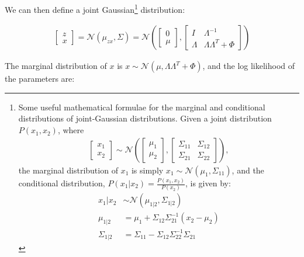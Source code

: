 \documentclass[letterpaper,10pt]{article}
\begin{document}
We can then define a joint Gaussian\footnote{
Some useful mathematical formulae for the marginal and conditional distributions of joint-Gaussian distributions. Given a joint distribution $P(x_1,x_2)$, where 
\begin{align}
\left[
      \begin{array}{c}
      x_1 \\
      x_2
    \end{array}
    \right] \sim \mathscr{N}\left( 
  \left[
      \begin{array}{c}
      \mu_1 \\
      \mu_2
    \end{array}
    \right]
    ,
  \left[
      \begin{array}{cc}
      \Sigma_{11} & \Sigma_{12} \\
      \Sigma_{21} & \Sigma_{22}
    \end{array}
    \right] 
    \right), 
\end{align}
the marginal distribution of $x_1$ is simply $x_1 \sim \mathscr{N}(\mu_1, \Sigma_{11})$, and the conditional distribution, $P(x_1 | x_2) = \frac{P(x_1,x_2)}{P(x_2)}$, is given by:
\begin{align}
x_1 | x_2 &\sim \mathscr{N}(\mu_{1|2}, \Sigma_{1|2}) \label{FactorAnalysisModel2} \\ 
\mu_{1|2} &= \mu_1 + \Sigma_{12} \Sigma^{-1}_{21} (x_2 - \mu_2) \\
\Sigma_{1|2} &= \Sigma_{11} - \Sigma_{12}\Sigma_{22}^{-1}\Sigma_{21}
\end{align}
}
 distribution:

\begin{align}
  \left[
    \begin{array}{c}
      z \\
      x
    \end{array}
  \right] 
  = 
  \mathscr{N}(\mu_{zx}, \Sigma) = \mathscr{N}
  \left(
  \left[
      \begin{array}{c}
      0 \\
      \mu
    \end{array}
    \right]
    ,
  \left[
      \begin{array}{cc}
      I & \Lambda^{-1} \\
      \Lambda & \Lambda \Lambda^T + \Phi
    \end{array}
    \right]    
  \right) \label{FactorAnalysisModel1}
\end{align}

The marginal distribution of $x$ is $x \sim \mathscr{N}(\mu, \Lambda \Lambda^T + \Phi)$, and the log likelihood of the parameters are:
\end{document}
